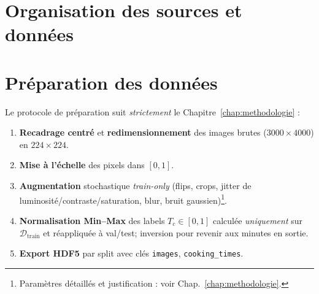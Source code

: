 \section{Organisation des sources et données}
\label{sec:orga_sources}


\section{Préparation des données}
\label{sec:pretraitement}

Le protocole de préparation suit \textit{strictement} le Chapitre~\ref{chap:methodologie} :
\begin{enumerate}
    \item \textbf{Recadrage centré} et \textbf{redimensionnement} des images brutes (\(3000\times4000\)) en \(224\times224\).
    \item \textbf{Mise à l’échelle} des pixels dans \([0,1]\).
    \item \textbf{Augmentation} stochastique \textit{train-only} (flips, crops, jitter de luminosité/contraste/saturation, blur, bruit gaussien)\footnote{Paramètres détaillés et justification : voir Chap.~\ref{chap:methodologie}.}.
    \item \textbf{Normalisation Min--Max} des labels \(T_c\in[0,1]\) calculée \emph{uniquement} sur \(\mathcal{D}_{\text{train}}\) et réappliquée à val/test; inversion pour revenir aux minutes en sortie.
    \item \textbf{Export HDF5} par split avec clés \texttt{images}, \texttt{cooking\_times}.
\end{enumerate}

